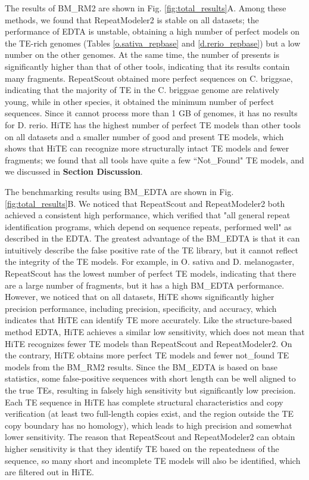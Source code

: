 \documentclass{bmcart}
\begin{document}
The results of BM\_RM2 are shown in Fig. \ref{fig:total_results}A. Among these methods, we found that RepeatModeler2 is stable on all datasets; the performance of EDTA is unstable, obtaining a high number of perfect models on the TE-rich genomes (Tables \ref{o.sativa_repbase} and \ref{d.rerio_repbase}) but a low number on the other genomes. At the same time, the number of presents is significantly higher than that of other tools, indicating that its results contain many fragments. RepeatScout obtained more perfect sequences on C. briggsae, indicating that the majority of TE in the C. briggsae genome are relatively young, while in other species, it obtained the minimum number of perfect sequences. Since it cannot process more than 1 GB of genomes, it has no results for D. rerio. HiTE has the highest number of perfect TE models than other tools on all datasets and a smaller number of good and present TE models, which shows that HiTE can recognize more structurally intact TE models and fewer fragments; we found that all tools have quite a few ``Not\_Found" TE models, and we discussed in \textbf{Section Discussion}.

The benchmarking results using BM\_EDTA are shown in Fig. \ref{fig:total_results}B. We noticed that RepeatScout and RepeatModeler2 both achieved a consistent high performance, which verified that "all general repeat identification programs, which depend on sequence repeats, performed well" as described in the EDTA\cite{ou2019benchmarking}. The greatest advantage of the BM\_EDTA is that it can intuitively describe the false positive rate of the TE library, but it cannot reflect the integrity of the TE models. For example, in O. sativa and D. melanogaster, RepeatScout has the lowest number of perfect TE models, indicating that there are a large number of fragments, but it has a high BM\_EDTA performance. However, we noticed that on all datasets, HiTE shows significantly higher precision performance, including precision, specificity, and accuracy, which indicates that HiTE can identify TE more accurately. Like the structure-based method EDTA, HiTE achieves a similar low sensitivity, which does not mean that HiTE recognizes fewer TE models than RepeatScout and RepeatModeler2. On the contrary, HiTE obtains more perfect TE models and fewer not\_found TE models from the BM\_RM2 results. 
Since the BM\_EDTA is based on base statistics, some false-positive sequences with short length can be well aligned to the true TEs, resulting in falsely high sensitivity but significantly low precision. Each TE sequence in HiTE has complete structural characteristics and copy verification (at least two full-length copies exist, and the region outside the TE copy boundary has no homology), which leads to high precision and somewhat lower sensitivity.
The reason that RepeatScout and RepeatModeler2 can obtain higher sensitivity is that they identify TE based on the repeatedness of the sequence, so many short and incomplete TE models will also be identified, which are filtered out in HiTE.
\end{document}
